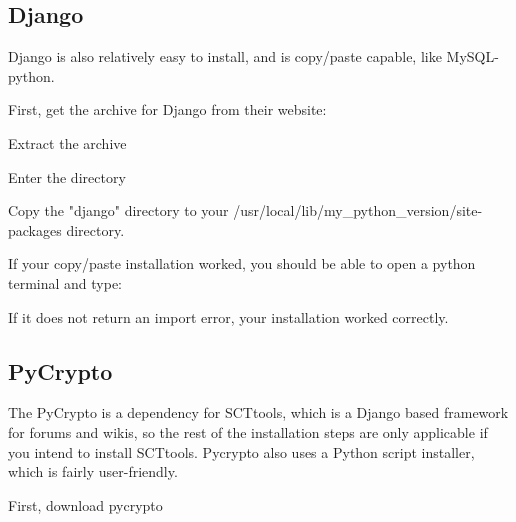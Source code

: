 \subsection{Django}
Django is also relatively easy to install, and is copy/paste capable, like MySQL-python.

\vspace{1pc}

First, get the archive for Django from their website:


\vspace{1pc}

Extract the archive


\vspace{1pc}

Enter the directory


\vspace{1pc}

Copy the "django" directory to your /usr/local/lib/my\_python\_version/site-packages directory.


\vspace{1pc}

If your copy/paste installation worked, you should be able to open a python terminal and type:


If it does not return an import error, your installation worked correctly.

\subsection{PyCrypto}
The PyCrypto is a dependency for SCTtools, which is a Django based framework for forums and wikis, so the rest of the installation steps are only applicable if you intend to install SCTtools.  Pycrypto also uses a Python script installer, which is fairly user-friendly.

\vspace{1pc}

First, download pycrypto


\vspace{1pc}


